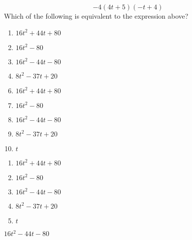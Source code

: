  
$$ -4(4t+5)(-t+4)$$
Which of the following is equivalent to the expression above?


\ifsat
	\begin{enumerate}[label=\Alph*)]
		\item $16t^2+44t+80 $ 
		\item $16t^2-80 $ 
		\item $16t^2-44t-80 $ %
		\item $8t^2-37t+20 $
	\end{enumerate}
\else
\fi

\ifacteven
	\begin{enumerate}[label=\textbf{\Alph*.},itemsep=\fill,align=left]
		\setcounter{enumii}{5}
		\item $16t^2+44t+80 $ 
		\item $16t^2-80 $ 
		\item $16t^2-44t-80 $ %
		\addtocounter{enumii}{1}
		\item $8t^2-37t+20 $
		\item $t $
	\end{enumerate}
\else
\fi

\ifactodd
	\begin{enumerate}[label=\textbf{\Alph*.},itemsep=\fill,align=left]
		\item $16t^2+44t+80 $ 
		\item $16t^2-80 $ 
		\item $16t^2-44t-80 $ %
		\item $8t^2-37t+20 $
		\item $t $
	\end{enumerate}
\else
\fi

\ifgridin
 $16t^2-44t-80 $ %
		
\else
\fi

